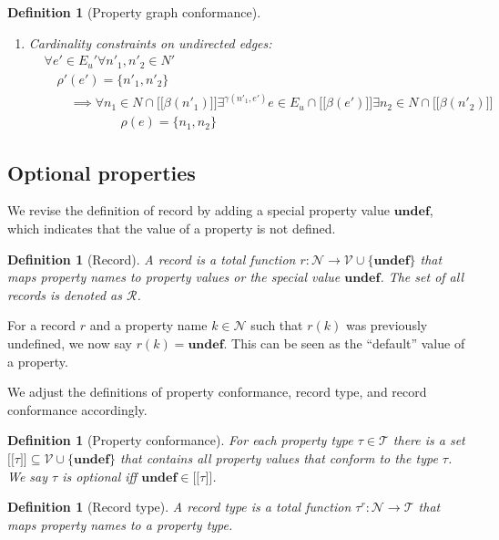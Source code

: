 \documentclass[a4paper]{article}
\newtheorem{definition}[theorem]{Definition}
\newcommand{\ptype}{\tau}
\newcommand{\ptypes}{\mathcal{T}}
\newcommand{\rtype}{\tau^r}
\newcommand{\lsem}{\ensuremath{[\![}}
\newcommand{\rsem}{\ensuremath{]\!]}}
\newcommand{\sem}[1]{\ensuremath{\lsem #1 \rsem}}
\newcommand{\undefined}{\mathbf{undef}}
\begin{document}
\begin{definition}[Property graph conformance]
\begin{enumerate}
    \item Cardinality constraints on undirected edges:
    \begin{align*}
      &\forall e' \in E_u' \forall n'_1, n'_2 \in N'\\
      &\quad\rho'(e') = \{n'_1, n'_2\}\\
      &\quad\quad\implies {} \forall n_1 \in N \cap \sem{\beta(n'_1)} \exists^{\gamma(n'_1, e')} e \in E_u \cap \sem{\beta(e')} \exists n_2 \in N \cap \sem{\beta(n'_2)}\\
      &\quad\quad\quad\quad\quad\quad\rho(e) = \{n_1, n_2\}
    \end{align*}
  \end{enumerate}
\end{definition}

\subsection{Optional properties}

We revise the definition of record by adding a special property value $\undefined$, which indicates that the value of a property is not defined.

\begin{definition}[Record]
  A \emph{record} is a total function $r : \mathcal{N} \to \mathcal{V} \cup \{\undefined\}$ that maps property names to property values or the special value $\undefined$. The set of all records is denoted as $\mathcal{R}$.
\end{definition}

For a record $r$ and a property name $k \in \mathcal{N}$ such that $r(k)$ was previously undefined, we now say $r(k) = \undefined$. This can be seen as the ``default'' value of a property.

We adjust the definitions of property conformance, record type, and record conformance accordingly.

\begin{definition}[Property conformance]
  For each property type $\ptype \in \ptypes$ there is a set $\sem{\ptype} \subseteq \mathcal{V} \cup \{\undefined\}$ that contains all property values that \emph{conform} to the type $\ptype$. We say $\ptype$ is \emph{optional} iff $\undefined \in \sem{\ptype}$.
\end{definition}

\begin{definition}[Record type]
  A \emph{record type} is a total function $\rtype : \mathcal{N} \to \ptypes$ that maps property names to a property type.
\end{definition}
\end{document}
